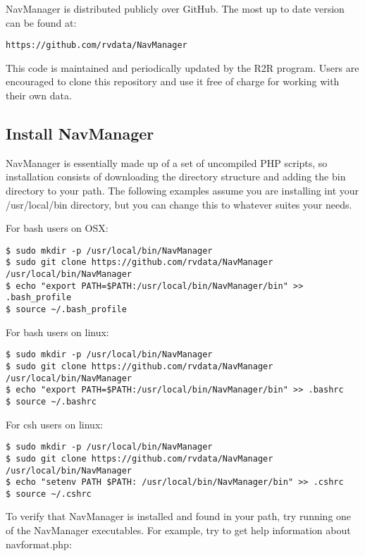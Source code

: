 \documentclass{article}
\begin{document}
NavManager is distributed publicly over GitHub.  The most up to date version can be found at:

		\begin{lstlisting}
https://github.com/rvdata/NavManager
		\end{lstlisting}
		
This code is maintained and periodically updated by the R2R program.  Users are encouraged to clone this repository and use it free of charge for working with their own data.
		
		\subsection{Install NavManager}
		
NavManager is essentially made up of a set of uncompiled PHP scripts, so installation consists of downloading the directory structure and adding the bin directory to your path.  The following examples assume you are installing int your /usr/local/bin directory, but you can change this to whatever suites your needs.

	\break

For bash users on OSX:

		\begin{lstlisting}
$ sudo mkdir -p /usr/local/bin/NavManager
$ sudo git clone https://github.com/rvdata/NavManager /usr/local/bin/NavManager
$ echo "export PATH=$PATH:/usr/local/bin/NavManager/bin" >> .bash_profile
$ source ~/.bash_profile
		\end{lstlisting}
		
For bash users on linux:
		
		\begin{lstlisting}
$ sudo mkdir -p /usr/local/bin/NavManager
$ sudo git clone https://github.com/rvdata/NavManager /usr/local/bin/NavManager
$ echo "export PATH=$PATH:/usr/local/bin/NavManager/bin" >> .bashrc
$ source ~/.bashrc
		\end{lstlisting}
		
For csh users on linux:
		
		\begin{lstlisting}
$ sudo mkdir -p /usr/local/bin/NavManager
$ sudo git clone https://github.com/rvdata/NavManager /usr/local/bin/NavManager
$ echo "setenv PATH $PATH: /usr/local/bin/NavManager/bin" >> .cshrc
$ source ~/.cshrc
		\end{lstlisting}

		
To verify that NavManager is installed and found in your path, try running one of the NavManager executables.  For example, try to get help information about navformat.php:
\end{document}
